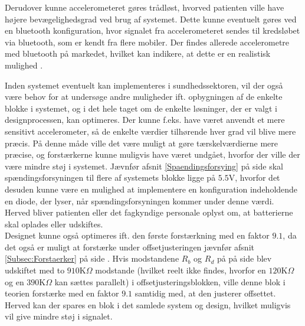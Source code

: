 Derudover kunne accelerometeret gøres trådløst, hvorved patienten ville have højere bevægelighedsgrad ved brug af systemet. Dette kunne eventuelt gøres ved en bluetooth konfiguration, hvor signalet fra accelerometeret sendes til kredsløbet via bluetooth, som er kendt fra flere mobiler. Der findes allerede accelerometre med bluetooth på markedet, hvilket kan indikere, at dette er en realistisk mulighed \cite{Axivity2015, Bioradio2015}.

Inden systemet eventuelt kan implementeres i sundhedssektoren, vil der også være behov for at undersøge andre muligheder ift. opbygningen af de enkelte blokke i systemet, og i det hele taget om de enkelte løsninger, der er valgt i designprocessen, kan optimeres. Der kunne f.eks. have været anvendt et mere sensitivt accelerometer, så de enkelte værdier tilhørende hver grad vil blive mere præcis. På denne måde ville det være muligt at gøre tærskelværdierne mere præcise, og forstærkerne kunne muligvis have været undgået, hvorfor der ville der være mindre støj i systemet. Jævnfør afsnit \ref{Spaendingsforsying} på side \pageref{Spaendingsforsying} skal spændingsforsyningen til flere af systemets blokke ligge på $5.5$V, hvorfor det desuden kunne være en mulighed at implementere en konfiguration indeholdende en diode, der lyser, når spændingsforsyningen kommer under denne værdi. Herved bliver patienten eller det fagkyndige personale oplyst om, at batterierne skal oplades eller udskiftes. \\
Designet kunne også optimeres ift. den første forstærkning med en faktor $9.1$, da det også er muligt at forstærke under offsetjusteringen jævnfør afsnit \ref{Subsec:Forstaerker} på side \pageref{Subsec:Forstaerker}. Hvis modstandene $R_{b}$ og $R_{d}$ på  på side \pageref{fig:Forstaerker_faktor18} blev udskiftet med to $910$K$\Omega$ modstande (hvilket reelt ikke findes, hvorfor en $120$K$\Omega$ og en $390$K$\Omega$ kan sættes parallelt) i offsetjusteringsblokken, ville denne blok i teorien forstærke med en faktor $9.1$ samtidig med, at den justerer offsettet. Herved kan der spares en blok i det samlede system og design, hvilket muligvis vil give mindre støj i signalet.